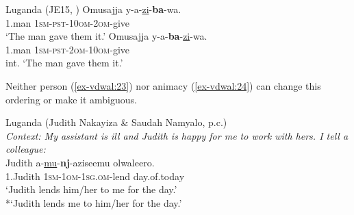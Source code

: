 \documentclass[output=paper
,modfonts
,nonflat]{langsci/langscibook}
\begin{document}
\begin{exe}
\ex	Luganda (JE15, \citealt[13]{Ranero2015}) \label{ex-vdwal:22}
	\xlist
		\ex	
			\gll Omusajja y-a-\uline{zi}-\textbf{ba}-wa.\\
			1.man \textsc{1sm-pst-10om-2om}-give\\
			\glt `The man gave them it.'
		\ex 
			\gll *Omusajja y-a-\textbf{ba}-\uline{zi}-wa.\\
			1.man \textsc{1sm-pst-2om-10om}-give\\
			\glt int. `The man gave them it.'
	\endxlist
\end{exe}
Neither person (\ref{ex-vdwal:23}) nor animacy (\ref{ex-vdwal:24}) can change this ordering or make it ambiguous.

\begin{exe}
\ex	Luganda (Judith Nakayiza \& Saudah Namyalo, p.c.) \label{ex-vdwal:23}\\ 
\textit{Context: My assistant is ill and Judith is happy for me to work with hers. I tell a colleague:}\\
		\gll Judith a-\uline{mu}-\textbf{nj}-aziseemu olwaleero.\\
		1.Judith \textsc{1sm-1om-1sg.om}-lend day.of.today\\
		\glt `Judith lends him/her to me for the day.'\\
		*`Judith lends me to him/her for the day.'
\end{exe}
\end{document}

